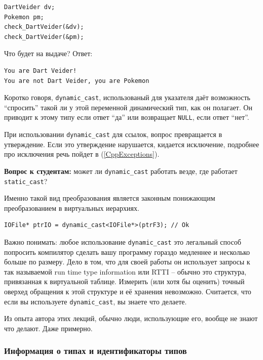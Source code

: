 \documentclass[a4paper,12pt,oneside]{article}
\newif\ifanswers
\begin{document}
\begin{lstlisting}
DartVeider dv;
Pokemon pm;
check_DartVeider(&dv);
check_DartVeider(&pm);
\end{lstlisting}

Что будет на выдаче? Ответ:

\begin{verbatim}
You are Dart Veider!
You are not Dart Veider, you are Pokemon
\end{verbatim}

Коротко говоря, \lstinline!dynamic_cast!, использованый для указателя даёт возможность ``спросить'' такой ли у этой переменной динамический тип, как он полагает. Он приводит к этому типу если ответ ``да'' или возвращает \lstinline!NULL!, если ответ ``нет''.

При использовании \lstinline!dynamic_cast! для ссылок, вопрос превращается в утверждение. Если это утверждение нарушается, кидается исключение, подробнее про исключения речь пойдет в (\ref{CppExceptions}).

\textbf{Вопрос к студентам:} может ли \lstinline!dynamic_cast! работать везде, где работает \lstinline!static_cast!?

\ifanswers
Правильный ответ: нет \lstinline!dynamic_cast! очень важно, чтобы в базовом классе была хотя бы одна виртуальная функция -- если таблицы виртуальных методов не будет существовать, динамическое приведение не будет работать.
\fi

Именно такой вид преобразования является законным понижающим преобразованием в виртуальных иерархиях.

\begin{lstlisting}
IOFile* ptrIO = dynamic_cast<IOFile*>(ptrF3); // Ok
\end{lstlisting}

Важно понимать: любое использование \lstinline!dynamic_cast! это легальный способ попросить компилятор сделать вашу программу гораздо медленнее и несколько больше по размеру. Дело в том, что для своей работы он использует запросы к так называемой run time type information или RTTI -- обычно это структура, привязанная к виртуальной таблице. Измерить (или хотя бы оценить) точный оверхед обращения к этой структуре и её хранения невозможно. Считается, что если вы используете \lstinline!dynamic_cast!, вы знаете что делаете.

Из опыта автора этих лекций, обычно люди, использующие его, вообще не знают что делают. Даже примерно.

\subsubsection{Информация о типах и идентификаторы типов}\label{TypeInfo}
\end{document}
